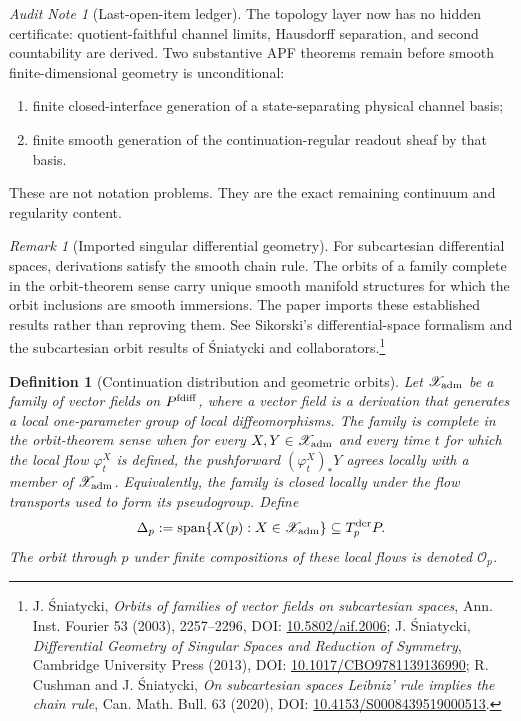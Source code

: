 \documentclass[11pt]{article}
\newtheorem{definition}[theorem]{Definition}
\theoremstyle{remark}
\newtheorem{remark}[theorem]{Remark}
\newtheorem{audit}[theorem]{Audit Note}
\begin{document}
\begin{audit}[Last-open-item ledger]
The topology layer now has no hidden certificate: quotient-faithful channel
limits, Hausdorff separation, and second countability are derived. Two
substantive APF theorems remain before smooth finite-dimensional geometry is
unconditional:
\begin{enumerate}[label=(\roman*)]
\item finite closed-interface generation of a state-separating physical channel
basis;
\item finite smooth generation of the continuation-regular readout sheaf by
that basis.
\end{enumerate}
These are not notation problems. They are the exact remaining continuum and
regularity content.
\end{audit}

\begin{remark}[Imported singular differential geometry]
For subcartesian differential spaces, derivations satisfy the smooth chain
rule.  The orbits of a family complete in the orbit-theorem sense carry unique
smooth manifold structures for which the orbit inclusions are smooth
immersions.  The paper imports these established results rather than
reproving them.  See Sikorski's differential-space formalism and the subcartesian orbit results of Śniatycki and collaborators.\footnote{J. Śniatycki, \emph{Orbits of families of vector fields on subcartesian spaces}, Ann. Inst. Fourier 53 (2003), 2257--2296, DOI: \href{https://doi.org/10.5802/aif.2006}{10.5802/aif.2006}; J. Śniatycki, \emph{Differential Geometry of Singular Spaces and Reduction of Symmetry}, Cambridge University Press (2013), DOI: \href{https://doi.org/10.1017/CBO9781139136990}{10.1017/CBO9781139136990}; R. Cushman and J. Śniatycki, \emph{On subcartesian spaces Leibniz' rule implies the chain rule}, Can. Math. Bull. 63 (2020), DOI: \href{https://doi.org/10.4153/S0008439519000513}{10.4153/S0008439519000513}.}
\end{remark}

\begin{definition}[Continuation distribution and geometric orbits]
\label{def:continuation-distribution}
Let $\mathscr X_{\rm adm}$ be a family of vector fields on
$P^{\rm fdiff}$, where a vector field is a derivation that generates a local
one-parameter group of local diffeomorphisms.  The family is
\emph{complete in the orbit-theorem sense} when for every
$X,Y\in\mathscr X_{\rm adm}$ and every time $t$ for which the local flow
$\varphi_t^X$ is defined, the pushforward
$(\varphi_t^X)_*Y$ agrees locally with a member of
$\mathscr X_{\rm adm}$.  Equivalently, the family is closed locally under the
flow transports used to form its pseudogroup.  Define
\[
        \Delta_p:=\operatorname{span}\{X(p):X\in\mathscr X_{\rm adm}\}
        \subseteq T_p^{\rm der}P.
\]
The orbit through $p$ under finite compositions of these local flows is denoted
$\mathcal O_p$.
\end{definition}
\end{document}
